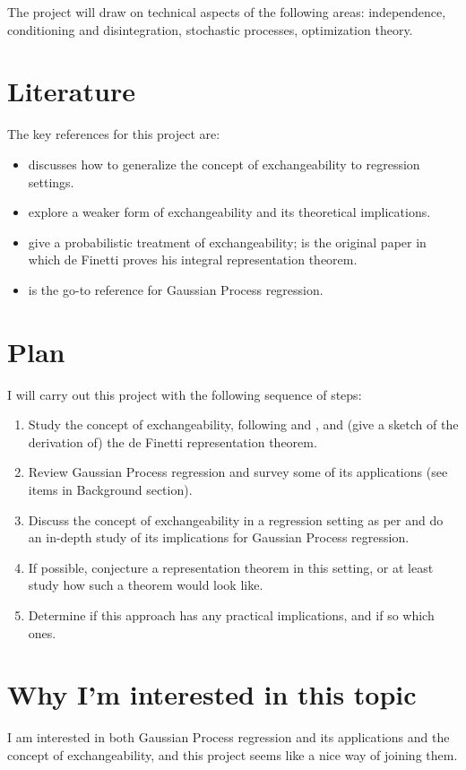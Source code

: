 \documentclass[]{STAT_547C}
\begin{document}
The project will draw on technical aspects of the following areas: independence, conditioning and disintegration, stochastic processes, optimization theory.


\section{Literature}

The key references for this project are:

\begin{itemize}
  \item \citet{McCullagh:2005:ExchAndReg} discusses how to generalize the concept of exchangeability to regression settings. 
  \item \cite{CampbellEtAl:2019:LocalExch} explore a weaker form of exchangeability and its theoretical implications.
  \item \cite{Kingman:1978, Bernardo:1996:Exch} give a probabilistic treatment of exchangeability; \cite{deFinetti:1930:RepTheorem} is the original paper in which de Finetti proves his integral representation theorem.
  \item \cite{RasmussenWilliams:2006} is the go-to reference for Gaussian Process regression.
\end{itemize}


\section{Plan}

I will carry out this project with the following sequence of steps: 
\begin{enumerate}
  \item Study the concept of exchangeability, following \cite{Kingman:1978} and \cite{Bernardo:1996:Exch}, and (give a sketch of the derivation of) the de Finetti representation theorem.
  \item Review Gaussian Process regression and survey some of its applications (see items in Background section).
  \item Discuss the concept of exchangeability in a regression setting as per \cite{McCullagh:2005:ExchAndReg} and do an in-depth study of its implications for Gaussian Process regression. 
  \item If possible, conjecture a representation theorem in this setting, or at least study how such a theorem would look like.
  \item Determine if this approach has any practical implications, and if so which ones.
\end{enumerate}


\section{Why I'm interested in this topic}

I am interested in both Gaussian Process regression and its applications and the concept of exchangeability, and this project seems like a nice way of joining them.


\printbibliography
\end{document}
